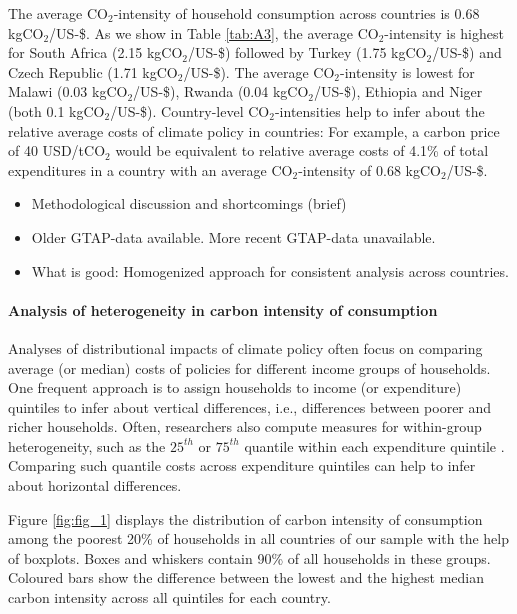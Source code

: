 \documentclass[12pt, a4paper]{article}
\begin{document}

The average CO$_{2}$-intensity of household consumption across countries is 0.68 kgCO$_{2}$/US-\$. As we show in Table \ref{tab:A3}, the average CO$_{2}$-intensity is highest for South Africa (2.15 kgCO$_{2}$/US-\$) followed by Turkey (1.75 kgCO$_{2}$/US-\$) and Czech Republic (1.71 kgCO$_{2}$/US-\$). The average CO$_{2}$-intensity is lowest for Malawi (0.03 kgCO$_{2}$/US-\$), Rwanda (0.04 kgCO$_{2}$/US-\$), Ethiopia and Niger (both 0.1 kgCO$_{2}$/US-\$). Country-level CO$_{2}$-intensities help to infer about the relative average costs of climate policy in countries: For example, a carbon price of 40 USD/tCO$_{2}$ \autocite{Stiglitz.2017} would be equivalent to relative average costs of 4.1\% of total expenditures in a country with an average CO$_{2}$-intensity of 0.68 kgCO$_{2}$/US-\$.

\begin{itemize}
    \item Methodological discussion and shortcomings (brief)
    \item Older GTAP-data available. More recent GTAP-data unavailable.
    \item What is good: Homogenized approach for consistent analysis across countries.
\end{itemize}

\paragraph{Analysis of heterogeneity in carbon intensity of consumption}

Analyses of distributional impacts of climate policy often focus on comparing average (or median) costs of policies for different income groups of households. One frequent approach is to assign households to income (or expenditure) quintiles to infer about vertical differences, i.e., differences between poorer and richer households. Often, researchers also compute measures for within-group heterogeneity, such as the $25^{th}$ or $75^{th}$ quantile within each expenditure quintile \autocite{Cronin.2019, Missbach.2024}. Comparing such quantile costs across expenditure quintiles can help to infer about horizontal differences.

Figure \ref{fig:fig_1} displays the distribution of carbon intensity of consumption among the poorest 20\% of households in all countries of our sample with the help of boxplots. Boxes and whiskers contain 90\% of all households in these groups. Coloured bars show the difference between the lowest and the highest median carbon intensity across all quintiles for each country.
\end{document}
